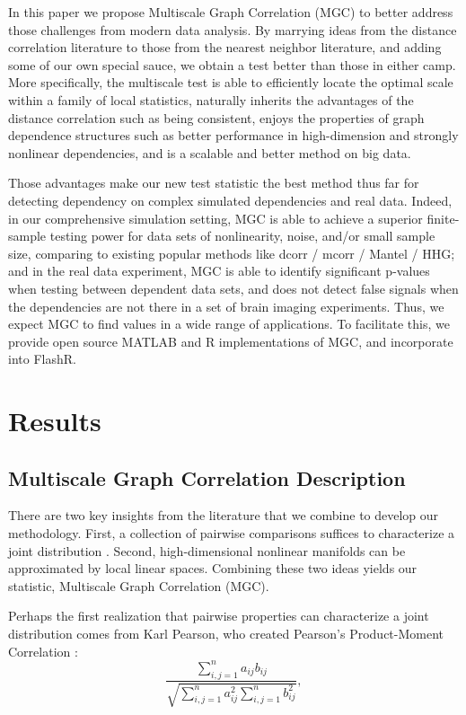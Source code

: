 \documentclass[11pt]{article}
\begin{document}
In this paper we propose Multiscale Graph Correlation (MGC) to better address those challenges from modern data analysis. By marrying ideas from the distance correlation literature to those from the nearest neighbor literature, and adding some of our own special sauce, we obtain a test better than those in either camp.  More specifically,  the multiscale test is able to efficiently locate the optimal scale within a family of local statistics, naturally inherits the advantages of the distance correlation such as being consistent, enjoys the properties of graph dependence structures such as better performance in high-dimension and strongly nonlinear dependencies, and is a scalable and better method on big data. 

Those advantages make our new test statistic the best method thus far for detecting dependency on complex simulated dependencies and real data. Indeed, in our comprehensive simulation setting, MGC is able to achieve a superior finite-sample testing power for data sets of nonlinearity, noise, and/or small sample size, comparing to existing popular methods like dcorr / mcorr / Mantel / HHG; and in the real data experiment, MGC is able to identify significant p-values when testing between dependent data sets,  and does not detect false signals when the dependencies are not there in a set of brain imaging experiments. Thus, we expect MGC to find values in a wide range of applications.  To facilitate this, we provide open source MATLAB and R implementations of MGC, and incorporate into FlashR.

\section{Results}
\label{main}
\subsection{Multiscale Graph Correlation Description}
\label{main1}
There are two key insights from the literature that we combine to develop our methodology.  First, a collection of pairwise comparisons  suffices to characterize a joint distribution \cite{Maa1996}.  Second, high-dimensional nonlinear manifolds can be approximated by local linear spaces.  Combining these two ideas yields our statistic,  Multiscale Graph Correlation (MGC).  

Perhaps the first realization that pairwise properties can characterize a joint distribution comes from  Karl Pearson, who created Pearson's Product-Moment Correlation \cite{Pearson1895}:
\begin{equation}
\label{generalCoef}
\frac{\sum_{i,j=1}^n a_{ij} b_{ij}}{\sqrt{\sum_{i,j=1}^n  a_{ij}^{2} \sum_{i,j=1}^n b_{ij}^{2}}}, 
\end{equation}
\end{document}
